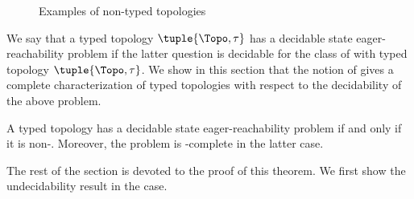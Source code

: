 \documentclass{LMCS}
\newenvironment{theorem}{\begin{thm}}{\end{thm}}
\begin{document}
\begin{figure}[b]
  \caption{Examples of non-\converging typed topologies}
  \label{fig:non-confluent-examples}
\end{figure}

We say that a typed topology $\tuple{\Topo,\tau}$ has a decidable \rqcp state
eager-reachability problem if the latter question is decidable for the class of
\rqcp with typed topology $\tuple{\Topo,\tau}$.  We show in this section that the notion of
\convergence gives a complete characterization of typed topologies
with respect to the decidability of the above problem.

\begin{theorem}\label{thm:conv}
  A typed topology has a decidable \rqcp state
 eager-reachability problem  if and only if it is non-\converging.
  Moreover, the problem is \dexptime-complete in the latter case.
\end{theorem}

The rest of the section is devoted to the proof of this theorem.
We first show the undecidability result in the \converging case.
\end{document}
